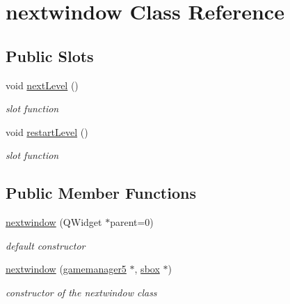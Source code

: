 \hypertarget{classnextwindow}{\section{nextwindow \-Class \-Reference}
\label{classnextwindow}
}
\subsection*{\-Public \-Slots}
\begin{DoxyCompactItemize}
\item 
void \hyperlink{classnextwindow_a480af59e0c8266ed2e4b7ee70fbe9650}{next\-Level} ()
\begin{DoxyCompactList}\small\item\em slot function \end{DoxyCompactList}\item 
void \hyperlink{classnextwindow_adadc3532646391ce1599a5c601465d94}{restart\-Level} ()
\begin{DoxyCompactList}\small\item\em slot function \end{DoxyCompactList}\end{DoxyCompactItemize}
\subsection*{\-Public \-Member \-Functions}
\begin{DoxyCompactItemize}
\item 
\hypertarget{classnextwindow_ab6c6fb42719fab970be2d5edcb0c6173}{\hyperlink{classnextwindow_ab6c6fb42719fab970be2d5edcb0c6173}{nextwindow} (\-Q\-Widget $\ast$parent=0)}\label{classnextwindow_ab6c6fb42719fab970be2d5edcb0c6173}

\begin{DoxyCompactList}\small\item\em default constructor \end{DoxyCompactList}\item 
\hyperlink{classnextwindow_aa5c76cc0a90c00ad95782f33e880c2e4}{nextwindow} (\hyperlink{classgamemanager5}{gamemanager5} $\ast$, \hyperlink{classsbox}{sbox} $\ast$)
\begin{DoxyCompactList}\small\item\em constructor of the nextwindow class \end{DoxyCompactList}\end{DoxyCompactItemize}
